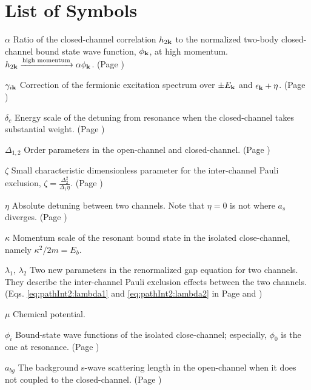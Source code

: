 \documentclass[edeposit,fullpage,prequest,10pt]{uiucthesis2009}
\begin{document}
\chapter{List of Symbols}

\begin{symbollist}[0.7in]
\item[$\alpha$]  Ratio of the closed-channel correlation $h_{2\mathbf{k}}$ to the normalized two-body closed-channel bound state wave function, $\phi_{\mathbf{k}}$, at high momentum.  $h_{2\mathbf{k}} \xrightarrow{\text{high momentum}}\alpha\phi_{\mathbf{k}}$. (Page \pageref{eq:pathInt2:hphi})
\item[$\gamma_{i\mathbf{k}}$] Correction of the fermionic excitation spectrum over $\pm{}E_{\mathbf{k}}$ and $\epsilon_{\mathbf{k}}+\eta$. (Page \pageref{eq:pathInt2:xiExpand})
\item[$\delta_{c}$] Energy scale of the  detuning from resonance when the closed-channel takes substantial weight. (Page \pageref{eq:intro:deltaC})
\item[$\Delta_{1,2}$] Order parameters in the open-channel and closed-channel. (Page \pageref{eq:pathInt2:identity})
\item[$\zeta$] Small characteristic dimensionless  parameter for the inter-channel Pauli exclusion, $\zeta=\frac{\Delta_{2}^{2}}{\Delta_{1}\eta}$. (Page \pageref{eq:pathInt2:zetaDef})
\item[$\eta$] Absolute detuning between two channels. Note that $\eta=0$ is not where $a_{s}$ diverges. (Page \pageref{eq:intro:ham})
\item[$\kappa$] Momentum scale of the resonant bound state in the isolated close-channel, namely  $\kappa^{2}/2m=E_{b}$.
\item[$\lambda_{1},\,\lambda_{2}$] Two new parameters in the renormalized gap equation for two channels. They describe the inter-channel Pauli exclusion effects between the two channels. (Eqs. \ref{eq:pathInt2:lambda1} and \ref{eq:pathInt2:lambda2} in Page \pageref{eq:pathInt2:lambda1} and \pageref{eq:pathInt2:lambda2})
\item[$\mu$] Chemical potential.
\item[$\phi_{i}$] Bound-state wave functions of the isolated close-channel; especially, $\phi_{0}$ is the one at resonance. (Page \pageref{eq:pathInt2:phi})
\item[$a_{bg}$] The background s-wave scattering length in the open-channel when it does not coupled to the closed-channel. (Page \pageref{eq:intro:abg})


\end{symbollist}
\end{document}

